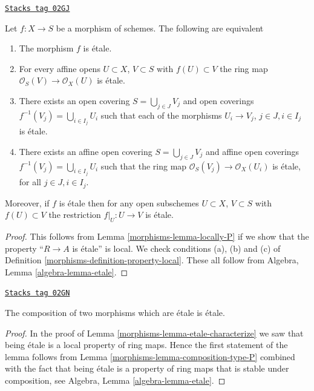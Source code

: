 \begin{lemma}
\label{morphisms-lemma-etale-characterize}
\href{https://stacks.math.columbia.edu/tag/02GJ}{\texttt{Stacks tag 02GJ}}

Let $f : X \to S$ be a morphism of schemes.
The following are equivalent
\begin{enumerate}
\item The morphism $f$ is \'etale.
\item For every affine opens $U \subset X$, $V \subset S$
with $f(U) \subset V$ the ring map
$\mathcal{O}_S(V) \to \mathcal{O}_X(U)$ is \'etale.
\item There exists an open covering $S = \bigcup_{j \in J} V_j$
and open coverings $f^{-1}(V_j) = \bigcup_{i \in I_j} U_i$ such
that each of the morphisms $U_i \to V_j$, $j\in J, i\in I_j$
is \'etale.
\item There exists an affine open covering $S = \bigcup_{j \in J} V_j$
and affine open coverings $f^{-1}(V_j) = \bigcup_{i \in I_j} U_i$ such
that the ring map $\mathcal{O}_S(V_j) \to \mathcal{O}_X(U_i)$ is
\'etale, for all $j\in J, i\in I_j$.
\end{enumerate}
Moreover, if $f$ is \'etale then for
any open subschemes $U \subset X$, $V \subset S$ with $f(U) \subset V$
the restriction $f|_U : U \to V$ is \'etale.
\end{lemma}

\begin{proof}

This follows from Lemma \ref{morphisms-lemma-locally-P} if we show that
the property ``$R \to A$ is \'etale'' is local.
We check conditions (a), (b) and (c) of Definition
\ref{morphisms-definition-property-local}.
These all follow from Algebra, Lemma \ref{algebra-lemma-etale}.
\end{proof}

\begin{lemma}
\label{morphisms-lemma-composition-etale}
\href{https://stacks.math.columbia.edu/tag/02GN}{\texttt{Stacks tag 02GN}}

The composition of two morphisms which are \'etale is \'etale.
\end{lemma}

\begin{proof}

In the proof of Lemma \ref{morphisms-lemma-etale-characterize}
we saw that being \'etale is a local property of ring maps.
Hence the first statement of the lemma follows from
Lemma \ref{morphisms-lemma-composition-type-P} combined
with the fact that being \'etale is a property of ring maps that is
stable under composition, see
Algebra, Lemma \ref{algebra-lemma-etale}.
\end{proof}

